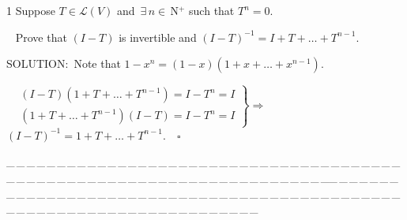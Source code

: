 \documentclass[a4paper, 11pt, UTF8]{article}
\def\Lm{\mathcal{L}}
\def\Nbp{$\,{\timesbf N}$^+}
\begin{document}
\begin{large}
{\timesbf\Large 1} {\timessl\Large 
Suppose $T\in\Lm(V)$ and $\,\exists\,n\in\Nbp$ such that $T^n=0.$}\par\,\,\,
{\timessl\Large Prove that $(I-T)$ is invertible and $(I-T)^{-1}=I+T+\dots+T^{n-1}.$}\par
{\timesbf S\footnotesize{OLUTION:}}\,\,\,Note that $1-x^n=(1-x)(1+x+\dots+x^{n-1}).$\par\,\,\,
$\left.\begin{array}{l}
(I-T)(1+T+\dots+T^{n-1})=I-T^n=I\\
(1+T+\dots+T^{n-1})(I-T)=I-T^n=I
\end{array}\right\}\Rightarrow$ $(I-T)^{-1}=1+T+\dots+T^{n-1}.\quad\square$\par
{\tiny \_\,\_\,\_\,\_\,\_\,\_\,\_\,\_\,\_\,\_\,\_\,\_\,\_\,\_\,\_\,\_\,\_\,\_\,\_\,\_\,\_\,\_\,\_\,\_\,\_\,\_\,\_\,\_\,\_\,\_\,\_\,\_\,\_\,\_\,\_\,\_\,\_\,\_\,\_\,\_\,\_\,\_\,\_\,\_\,\_\,\_\,\_\,\_\,\_\,\_\,\_\,\_\,\_\,\_\,\_\,\_\,\_\,\_\,\_\,\_\,\_\,\_\,\_\,\_\,\_\,\_\,\_\,\_\,\_\,\_\,\_\_\,\_\,\_\,\_\,\_\,\_\,\_\,\_\,\_\,\_\,\_\,\_\,\_\,\_\,\_\,\_\,\_\,\_\,\_\,\_\,\_\,\_\,\_\,\_\,\_\,\_\,\_\,\_\,\_\,\_\,\_\,\_\,\_\,\_\,\_\,\_\,\_\,\_\,\_\,\_\,\_\,\_\,\_\,\_\,\_\,\_\,\_\,\_\,\_\,\_\,\_\,\_\,\_\,\_\,\_\,\_\,\_\,\_\,\_\,\_\,\_\,\_\,\_\,\_\,\_\,\_\,\_\,\_\,\_\,\_\,\_}\par


\end{large}
\end{document}
